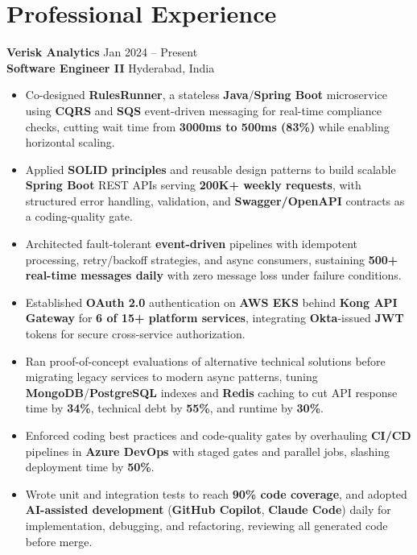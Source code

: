 \documentclass[a4paper,10pt]{article}
\begin{document}
\section*{Professional Experience}

\textbf{Verisk Analytics} \hfill Jan 2024 -- Present \\
\textbf{Software Engineer II} \hfill Hyderabad, India

\begin{itemize}[leftmargin=*]
    \item Co-designed \textbf{RulesRunner}, a stateless \textbf{Java}/\textbf{Spring Boot} microservice using \textbf{CQRS} and \textbf{SQS} event-driven messaging for real-time compliance checks, cutting wait time from \textbf{3000ms to 500ms (83\%)} while enabling horizontal scaling.
    \item Applied \textbf{SOLID principles} and reusable design patterns to build scalable \textbf{Spring Boot} REST APIs serving \textbf{200K+ weekly requests}, with structured error handling, validation, and \textbf{Swagger/OpenAPI} contracts as a coding-quality gate.
    \item Architected fault-tolerant \textbf{event-driven} pipelines with idempotent processing, retry/backoff strategies, and async consumers, sustaining \textbf{500+ real-time messages daily} with zero message loss under failure conditions.
    \item Established \textbf{OAuth 2.0} authentication on \textbf{AWS EKS} behind \textbf{Kong API Gateway} for \textbf{6 of 15+ platform services}, integrating \textbf{Okta}-issued \textbf{JWT} tokens for secure cross-service authorization.
    \item Ran proof-of-concept evaluations of alternative technical solutions before migrating legacy services to modern async patterns, tuning \textbf{MongoDB}/\textbf{PostgreSQL} indexes and \textbf{Redis} caching to cut API response time by \textbf{34\%}, technical debt by \textbf{55\%}, and runtime by \textbf{30\%}.
    \item Enforced coding best practices and code-quality gates by overhauling \textbf{CI/CD} pipelines in \textbf{Azure DevOps} with staged gates and parallel jobs, slashing deployment time by \textbf{50\%}.
    \item Wrote unit and integration tests to reach \textbf{90\% code coverage}, and adopted \textbf{AI-assisted development} (\textbf{GitHub Copilot}, \textbf{Claude Code}) daily for implementation, debugging, and refactoring, reviewing all generated code before merge.
\end{itemize}
\end{document}
